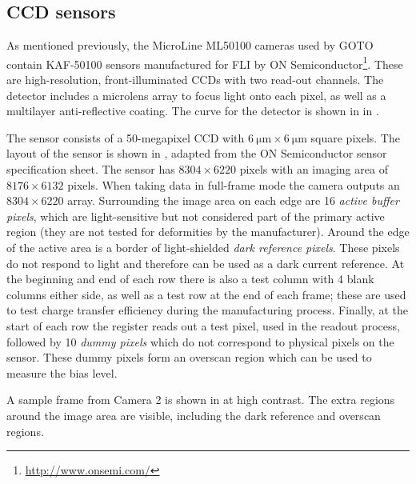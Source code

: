 \begin{colsection}
\begin{colsection}
\clearpage

\end{colsection}

\newpage
\subsection{CCD sensors}
\label{sec:chip_layout}
\begin{colsection}

As mentioned previously, the MicroLine ML50100 cameras used by GOTO contain KAF-50100  sensors manufactured for FLI by ON Semiconductor\footnote{\url{http://www.onsemi.com/}}. These are high-resolution, front-illuminated CCDs with two read-out channels. The detector includes a microlens array to focus light onto each pixel, as well as a multilayer anti-reflective coating. The  curve for the detector is shown in  in .

The sensor consists of a 50-megapixel CCD with $\SI{6}{\micro\metre} \times \SI{6}{\micro\metre}$ square pixels. The layout of the sensor is shown in , adapted from the ON Semiconductor sensor specification sheet. The sensor has $8304 \times 6220$ pixels with an imaging area of $8176 \times 6132$ pixels. When taking data in full-frame mode the camera outputs an $8304 \times 6220$ array. Surrounding the image area on each edge are 16 \emph{active buffer pixels}, which are light-sensitive but not considered part of the primary active region (they are not tested for deformities by the manufacturer). Around the edge of the active area is a border of light-shielded \emph{dark reference pixels}. These pixels do not respond to light and therefore can be used as a dark current reference. At the beginning and end of each row there is also a test column with 4 blank columns either side, as well as a test row at the end of each frame; these are used to test charge transfer efficiency during the manufacturing process. Finally, at the start of each row the register reads out a test pixel, used in the readout process, followed by 10 \emph{dummy pixels} which do not correspond to physical pixels on the sensor. These dummy pixels form an overscan region which can be used to measure the bias level.

A sample frame from Camera 2 is shown in  at high contrast. The extra regions around the image area are visible, including the dark reference and overscan regions.


\end{colsection}
\end{colsection}
